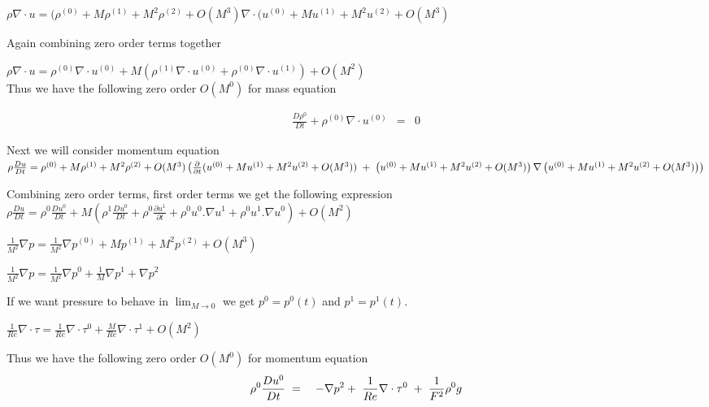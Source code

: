 \documentclass[11pt,a4paper]{article}
\begin{document}
$\rho \nabla\cdot u = (\rho^{(0)}+M\rho^{(1)}+M^2\rho^{(2)}+O(M^3) \nabla \cdot ( u^{(0)}+Mu^{(1)}+M^2u^{(2)}+O(M^3)$

Again combining zero order terms together 

$\rho \nabla\cdot u = \rho^{(0)} \nabla \cdot u^{(0)} + M (\rho^{(1)} \nabla \cdot u^{(0)}+\rho^{(0)} \nabla \cdot u^{(1)}) + O (M^2)$ \\ 
Thus we have the following zero order $O(M^0)$ for mass equation

\begin{eqnarray}
\frac{D \rho^0}{D t} + \rho^{(0)} \nabla \cdot u^{(0)} &=& 0
\end{eqnarray}

Next we will consider momentum equation  \\
$\rho\frac{D u}{D t} = \rho^{(0)}+M\rho^{(1)}+M^2\rho^{(2)}+O(M^3) \left(\frac{\partial}{\partial t}(u^{(0)}+Mu^{(1)}+M^2u^{(2)}+O(M^3))\hspace{1mm}+\hspace{1mm} \left( u^{(0)}+Mu^{(1)}+M^2u^{(2)}+O(M^3)\right) \nabla \left( u^{(0)}+Mu^{(1)}+M^2u^{(2)}+O(M^3) \right)\right) $

Combining zero order terms, first order terms we get the following expression \\

$\rho\frac{D u}{D t} =\rho^0 \frac{D u^0}{D t} + M \left( \rho^1 \frac{D u^0}{D t} + \rho^0 \frac{\partial u^1}{\partial t}+ \rho^0 u^0 . \nabla u^1 +\rho^0 u^1 . \nabla u^0\right) + O(M^2) $

$\frac{1}{M^2}\nabla p = \frac{1}{M^2} \nabla p^{(0)}+Mp^{(1)}+M^2p^{(2)}+O(M^3)$

$\frac{1}{M^2}\nabla p = \frac{1}{M^2}\nabla p^0 + \frac{1}{M}\nabla p^1 + \nabla p^2$

If we want pressure to behave in $\lim_{M \to 0}$ we get $p^0=p^0(t)$ and $p^1=p^1(t)$.

$\frac{1}{Re}\nabla\cdot\tau = \frac{1}{Re}\nabla\cdot\tau^0 +\frac{M}{Re}\nabla\cdot\tau^1 +O(M^2)$

Thus we have the following zero order $O(M^0)$ for momentum equation
 \begin{eqnarray}
 \rho^0 \frac{D u^0}{D t}\hspace{1mm} &=&\hspace{1mm}-\nabla p^2 +\hspace{1mm}\frac{1}{Re}\nabla\cdot\tau^0 \hspace{1mm}+\hspace{1mm}\frac{1}{F^2} \rho^0 g 
 \end{eqnarray}
 
\end{document}
